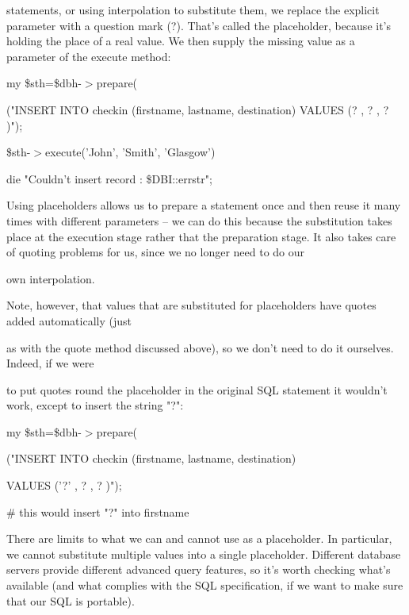 \documentclass[a4paper,11pt]{book}
\begin{document}
\noindent statements, or using interpolation to substitute them, we replace the explicit parameter with a question mark (?). That's called the placeholder, because it's holding the place of a real value. We then supply the missing value as a parameter of the execute method:

\noindent 

\noindent my \$sth=\$dbh-$>$prepare(

\noindent ("INSERT INTO checkin (firstname, lastname, destination) VALUES (? , ? , ? )");

\noindent 

\noindent \$sth-$>$execute('John', 'Smith', 'Glasgow')

\noindent \textbar \textbar  die "Couldn't insert record : \$DBI::errstr";

\noindent 

\noindent Using  placeholders  allows us to  prepare  a  statement  once  and  then  reuse  it  many times  with different parameters -- we can  do  this because  the  substitution  takes  place  at  the execution  stage  rather  that the preparation stage.  It also  takes  care  of quoting  problems  for  us,  since  we  no  longer  need  to  do  our

\noindent own  interpolation.

\noindent 

\noindent Note,  however,  that values that  are  substituted  for  placeholders  have  quotes  added  automatically  (just

\noindent as with the quote method  discussed  above),  so  we don't  need  to  do  it  ourselves.  Indeed,  if  we  were

\noindent to  put quotes round the placeholder  in  the  original  SQL  statement  it  wouldn't  work,  except  to insert the string "?":

\noindent 

\noindent my \$sth=\$dbh-$>$prepare(

\noindent ("INSERT INTO checkin (firstname, lastname, destination)

\noindent VALUES ('?' , ? , ? )");

\noindent \# this would insert "?" into firstname

\noindent 

\noindent There are limits to what we can and cannot use as a placeholder. In particular, we cannot substitute multiple values into a single placeholder. Different database servers provide different advanced query features, so it's worth checking what's available (and what complies with the SQL specification, if we want to make sure that our SQL is portable).
\end{document}

